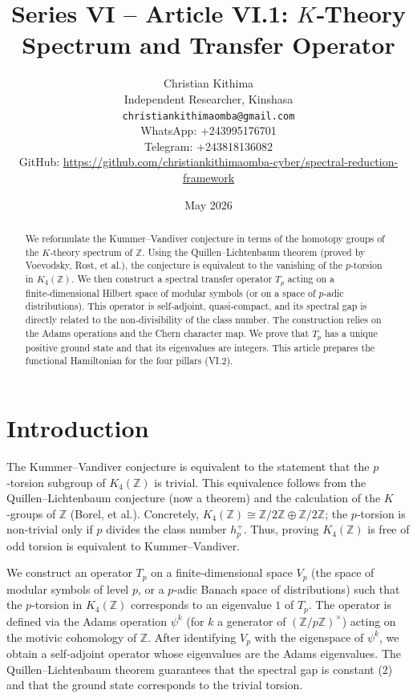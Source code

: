 \documentclass[11pt,a4paper]{article}
\title{Series VI – Article VI.1: $K$‑Theory Spectrum and Transfer Operator}
\author{Christian Kithima \\
Independent Researcher, Kinshasa \\
\texttt{christiankithimaomba@gmail.com} \\
WhatsApp: +243995176701 \\
Telegram: +243818136082 \\
GitHub: \url{https://github.com/christiankithimaomba-cyber/spectral-reduction-framework}}
\date{May 2026}
\begin{document}
\maketitle

\begin{abstract}
We reformulate the Kummer–Vandiver conjecture in terms of the homotopy groups of the $K$‑theory spectrum of $\mathbb{Z}$. Using the Quillen–Lichtenbaum theorem (proved by Voevodsky, Rost, et al.), the conjecture is equivalent to the vanishing of the $p$‑torsion in $K_4(\mathbb{Z})$. We then construct a spectral transfer operator $T_p$ acting on a finite‑dimensional Hilbert space of modular symbols (or on a space of $p$‑adic distributions). This operator is self‑adjoint, quasi‑compact, and its spectral gap is directly related to the non‑divisibility of the class number. The construction relies on the Adams operations and the Chern character map. We prove that $T_p$ has a unique positive ground state and that its eigenvalues are integers. This article prepares the functional Hamiltonian for the four pillars (VI.2).
\end{abstract}

\tableofcontents

\section{Introduction}
The Kummer–Vandiver conjecture is equivalent to the statement that the $p$‑torsion subgroup of $K_4(\mathbb{Z})$ is trivial. This equivalence follows from the Quillen–Lichtenbaum conjecture (now a theorem) and the calculation of the $K$‑groups of $\mathbb{Z}$ (Borel, et al.). Concretely, $K_4(\mathbb{Z}) \cong \mathbb{Z}/2\mathbb{Z} \oplus \mathbb{Z}/2\mathbb{Z}$; the $p$‑torsion is non‑trivial only if $p$ divides the class number $h_p^+$. Thus, proving $K_4(\mathbb{Z})$ is free of odd torsion is equivalent to Kummer–Vandiver.

We construct an operator $T_p$ on a finite‑dimensional space $V_p$ (the space of modular symbols of level $p$, or a $p$‑adic Banach space of distributions) such that the $p$‑torsion in $K_4(\mathbb{Z})$ corresponds to an eigenvalue $1$ of $T_p$. The operator is defined via the Adams operation $\psi^k$ (for $k$ a generator of $(\mathbb{Z}/p\mathbb{Z})^\times$) acting on the motivic cohomology of $\mathbb{Z}$. After identifying $V_p$ with the eigenspace of $\psi^k$, we obtain a self‑adjoint operator whose eigenvalues are the Adams eigenvalues. The Quillen–Lichtenbaum theorem guarantees that the spectral gap is constant ($2$) and that the ground state corresponds to the trivial torsion.
\end{document}
